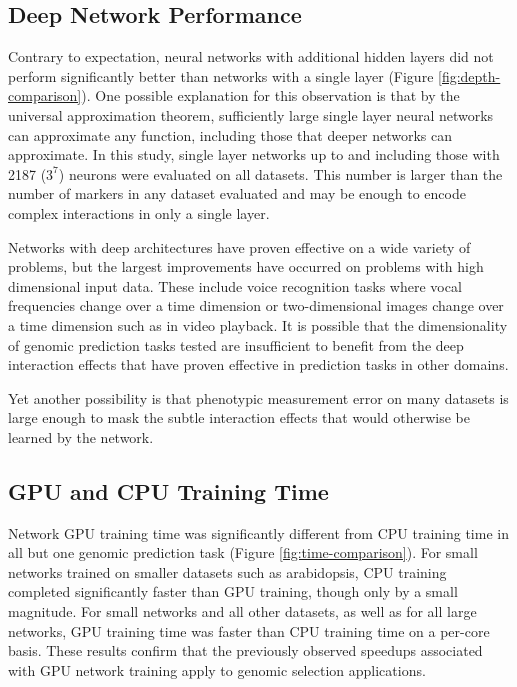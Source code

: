 \ifdefined\showtablesandfigures
\fi

\subsection*{Deep Network Performance}

Contrary to expectation, neural networks with additional hidden layers did not perform
significantly better than networks with a single layer (Figure \ref{fig:depth-comparison}). 
One possible explanation for this observation is that by the universal approximation theorem,
sufficiently large single layer neural networks can approximate any function, including those
that deeper networks can approximate. In this study, single layer networks up to and including
those with 2187 ($3^7$) neurons were evaluated on all datasets. This number is larger than the number
of markers in any dataset evaluated and may be enough to encode complex interactions in only a single
layer.

Networks with deep architectures have proven effective on a wide variety of problems, but the largest
improvements have occurred on problems with high dimensional input data. These include voice recognition 
tasks where vocal frequencies change over a time dimension or two-dimensional images change over 
a time dimension such as in video playback. It is possible that the dimensionality of genomic 
prediction tasks tested are insufficient to benefit from the deep interaction 
effects that have proven effective in prediction tasks in other domains. 

Yet another possibility is that phenotypic measurement error on many datasets is large enough 
to mask the subtle interaction effects that would otherwise be learned by the network.

\ifdefined\showtablesandfigures
\fi

\subsection*{GPU and CPU Training Time}

Network GPU training time was significantly different from CPU training time in all but
one genomic prediction task (Figure \ref{fig:time-comparison}). For small networks 
trained on smaller datasets such as arabidopsis, CPU training completed significantly 
faster than GPU training, though only by a small magnitude. For small networks and 
all other datasets, as well as for all large networks, GPU training time was faster 
than CPU training time on a per-core basis. These results confirm that the previously
observed speedups associated with GPU network training apply to genomic selection applications.

